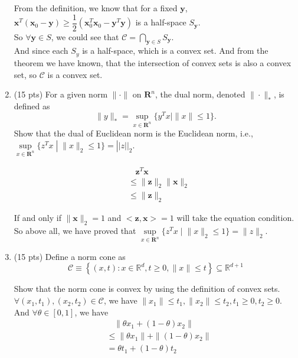\documentclass[10pt]{article}
\renewcommand{\mathbf}{\boldsymbol}
\begin{document}
\begin{enumerate}
From the definition, we know that for a fixed $\mathbf{y}$, 
$\mathbf{x}^T(\mathbf{x}_0-\mathbf{y}) \geq \dfrac{1}{2}(\mathbf{x}_0^T\mathbf{x}_0-\mathbf{y}^T\mathbf{y})$ is a half-space $S_{\mathbf{y}}$.\\

So $\forall\mathbf{y}\in S$, we could see that $\mathcal{C}=\bigcap\limits_{\mathbf{y}\in S}S_{\mathbf{y}}$.\\
And since each $S_y$ is a half-space, which is a convex set. And from the theorem we have known, that 
the intersection of convex sets is also a convex set, so $\mathcal{C}$ is a convex set.


\newpage

\item {\color{red} (15 pts)} For a given norm $\|\cdot\|$ on $\mathbf{R}^n$, the dual norm, denoted $\|\cdot\|_*$, is defined as
$$
\|y\|_*=\sup_{x\in\mathbf{R}^n} \{y^T x\mid\|x\|\leq1\}.
$$ 
Show that the dual of Euclidean norm is the Euclidean norm, i.e., $\sup\limits_{x \in \mathbf{R}^n}\{z^{T}x \;| \;\|x\|_2\leq1\}=||z||_{2}$.

\begin{align*}
    &\ \ \ \ \mathbf{z}^T\mathbf{x}\\
    &\leq \|\mathbf{z}\|_2\|\mathbf{x}\|_2\\  
    &\leq \|\mathbf{z}\|_2
\end{align*}

If and only if $\|\mathbf{x}\|_2=1$ and $<\mathbf{z},\mathbf{x}>=1$ will take the equation condition.\\
So above all, we have proved that $\sup\limits_{x \in \mathbf{R}^n}\{z^{T}x \;| \;\|x\|_2\leq1\}=\|z\|_{2}$.

\newpage

\item {\color{red} (15 pts)} Define a norm cone as
$$
\mathcal{C} \equiv \left\{(x, t): x \in \mathbb{R}^d, t \geq 0,\|x\| \leq t\right\} \subseteq \mathbb{R}^{d+1}
$$

Show that the norm cone is convex by using the definition of convex sets.\\

$\forall (x_1,t_1),(x_2,t_2)\in \mathcal{C}$, we have $\|x_1\|\leq t_1, \|x_2\|\leq t_2, t_1\geq 0,t_2\geq 0$.\\
And $\forall\theta\in [0,1]$, we have
\begin{align*}
    &\ \ \ \ \|\theta x_1+(1-\theta)x_2\|\\
    &\leq \|\theta x_1\|+\|(1-\theta)x_2\|\\
    &= \theta t_1+(1-\theta)t_2
\end{align*}


\end{enumerate}
\end{document}
